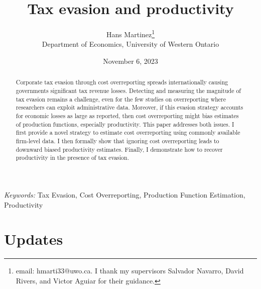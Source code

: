 \documentclass[
  12pt]{article}
\begin{document}
\def\spacingset#1{\renewcommand{\baselinestretch}%
{#1}\small\normalsize} \spacingset{1}



\date{November 6, 2023}
\title{\bf Tax evasion and productivity}
\author{
Hans Martinez\thanks{email: hmarti33@uwo.ca. I thank my supervisors
Salvador Navarro, David Rivers, and Victor Aguiar for their guidance.}\\
Department of Economics, University of Western Ontario\\
}
\maketitle

\bigskip
\bigskip
\begin{abstract}
Corporate tax evasion through cost overreporting spreads internationally
causing governments significant tax revenue losses. Detecting and
measuring the magnitude of tax evasion remains a challenge, even for the
few studies on overreporting where researchers can exploit
administrative data. Moreover, if this evasion strategy accounts for
economic losses as large as reported, then cost overreporting might bias
estimates of production functions, especially productivity. This paper
addresses both issues. I first provide a novel strategy to estimate cost
overreporting using commonly available firm-level data. I then formally
show that ignoring cost overreporting leads to downward biased
productivity estimates. Finally, I demonstrate how to recover
productivity in the presence of tax evasion.
\end{abstract}

\noindent%
{\it Keywords:} Tax Evasion, Cost Overreporting, Production Function
Estimation, Productivity
\vfill

\newpage
\spacingset{1.9} %
\ifdefined\Shaded\renewenvironment{Shaded}{\begin{tcolorbox}[borderline west={3pt}{0pt}{shadecolor}, breakable, boxrule=0pt, sharp corners, interior hidden, frame hidden, enhanced]}{\end{tcolorbox}}\fi

\hypertarget{updates}{%
\section*{Updates}\label{updates}}
\end{document}
